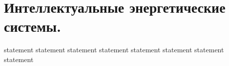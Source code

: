 \chapter{Интеллектуальные энергетические системы.}

%

{statement}
{statement}
{statement}
{statement}
{statement}
{statement}
{statement}
{statement}